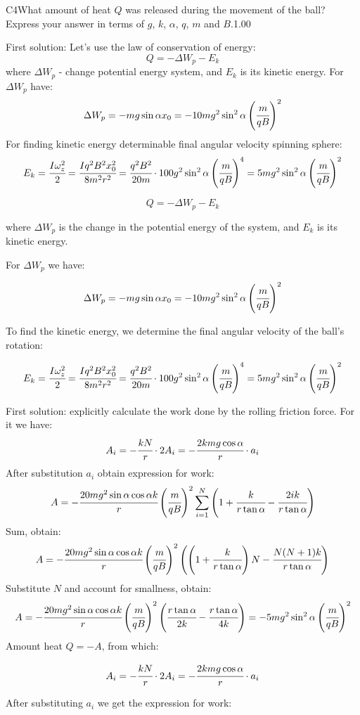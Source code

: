 \documentclass[11pt,a4paper]{article}
\begin{document}
\begin{solcard}{C4}{What amount of heat $Q$ was released during the movement of the ball? Express your answer in terms of $g$, $k$, $\alpha$, $q$, $m$ and $B$.}{1.00}

First solution: Let's use the law of conservation of energy: $$Q=-\Delta{W}_p-E_k $$ where $\Delta{W}_p$ - change potential energy system, and $E_k$ is its kinetic energy. For $\Delta{W}_p$ have: $$\Delta{W}_p=-mg\sin\alpha x_0=-10mg^2\sin^2\alpha\left(\cfrac{m}{qB}\right)^2 $$ For finding kinetic energy determinable final angular velocity spinning sphere: $$E_k=\cfrac{I\omega^2_z}{2}=\cfrac{Iq^2B^2x^2_0}{8m^2r^2}=\cfrac{q^2B^2}{20m}\cdot 100g^2\sin^2\alpha\left(\cfrac{m}{qB}\right)^4=5mg^2\sin^2\alpha\left(\cfrac{m}{qB}\right)^2 $$


$$Q=-\Delta{W}_p-E_k $$


where $\Delta{W}_p$ is the change in the potential energy of the system, and $E_k$ is its kinetic energy.


For $\Delta{W}_p$ we have:


$$\Delta{W}_p=-mg\sin\alpha x_0=-10mg^2\sin^2\alpha\left(\cfrac{m}{qB}\right)^2 $$


To find the kinetic energy, we determine the final angular velocity of the ball's rotation:


$$E_k=\cfrac{I\omega^2_z}{2}=\cfrac{Iq^2B^2x^2_0}{8m^2r^2}=\cfrac{q^2B^2}{20m}\cdot 100g^2\sin^2\alpha\left(\cfrac{m}{qB}\right)^4=5mg^2\sin^2\alpha\left(\cfrac{m}{qB}\right)^2 $$


First solution: explicitly calculate the work done by the rolling friction force. For it we have: $$A_i=-\cfrac{kN}{r}\cdot{2A_i}=-\cfrac{2kmg\cos\alpha}{r}\cdot{a_i} $$ After substitution $a_i$ obtain expression for work: $$A=-\cfrac{20mg^2\sin\alpha\cos\alpha k}{r}\left(\cfrac{m}{qB}\right)^2\sum\limits_{i=1}^N \left(1+\cfrac{k}{r\tan\alpha}-\cfrac{2ik}{r\tan\alpha}\right)$$ Sum, obtain: $$A=-\cfrac{20mg^2\sin\alpha\cos\alpha k}{r}\left(\cfrac{m}{qB}\right)^2\left(\left(1+\cfrac{k}{r\tan\alpha}\right)N-\cfrac{N(N+1)k}{r\tan\alpha}\right)$$ Substitute $N$ and account for smallness, obtain: $$A=-\cfrac{20mg^2\sin\alpha\cos\alpha k}{r}\left(\cfrac{m}{qB}\right)^2\left(\cfrac{r\tan\alpha}{2k}-\cfrac{r\tan\alpha}{4k}\right)=-5mg^2\sin^2\alpha\left(\cfrac{m}{qB}\right)^2 $$ Amount heat $Q=-A$, from which:


$$A_i=-\cfrac{kN}{r}\cdot{2A_i}=-\cfrac{2kmg\cos\alpha}{r}\cdot{a_i} $$


After substituting $a_i$ we get the expression for work:



\end{solcard}
\end{document}
